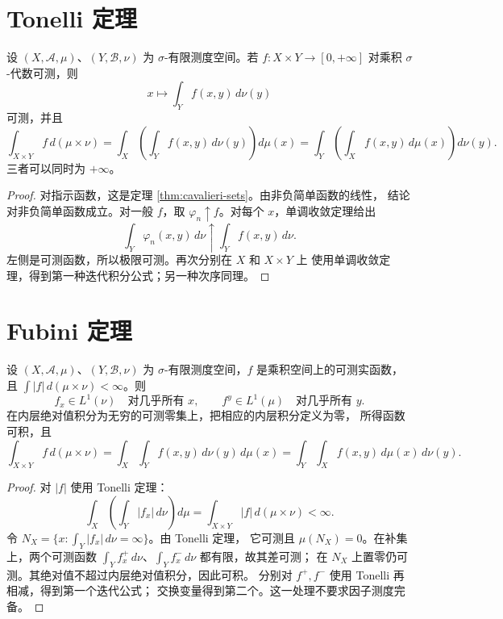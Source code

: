 \section{Tonelli 定理}

\begin{theorem}[Tonelli]
\label{thm:tonelli}
设 \((X,\mathcal A,\mu)\)、\((Y,\mathcal B,\nu)\) 为
\(\sigma\)-有限测度空间。若 \(f:X\times Y\to[0,+\infty]\)
对乘积 \(\sigma\)-代数可测，则
\[
 x\longmapsto\int_Yf(x,y)\,d\nu(y)
\]
可测，并且
\[
 \int_{X\times Y}f\,d(\mu\times\nu)
 =\int_X\left(\int_Yf(x,y)\,d\nu(y)\right)d\mu(x)
 =\int_Y\left(\int_Xf(x,y)\,d\mu(x)\right)d\nu(y).
\]
三者可以同时为 \(+\infty\)。
\end{theorem}

\begin{proof}
对指示函数，这是定理 \ref{thm:cavalieri-sets}。由非负简单函数的线性，
结论对非负简单函数成立。对一般 \(f\)，取
\(\varphi_n\uparrow f\)。对每个 \(x\)，单调收敛定理给出
\[
 \int_Y\varphi_n(x,y)\,d\nu\uparrow\int_Yf(x,y)\,d\nu.
\]
左侧是可测函数，所以极限可测。再次分别在 \(X\) 和 \(X\times Y\) 上
使用单调收敛定理，得到第一种迭代积分公式；另一种次序同理。
\end{proof}

\section{Fubini 定理}

\begin{theorem}[Fubini]
\label{thm:fubini}
设 \((X,\mathcal A,\mu)\)、\((Y,\mathcal B,\nu)\) 为
\(\sigma\)-有限测度空间，\(f\) 是乘积空间上的可测实函数，且
\(\int|f|\,d(\mu\times\nu)<\infty\)。则
\[
 f_x\in L^1(\nu)\quad\text{对几乎所有 }x,
\qquad
 f^y\in L^1(\mu)\quad\text{对几乎所有 }y.
\]
在内层绝对值积分为无穷的可测零集上，把相应的内层积分定义为零，
所得函数可积，且
\[
 \int_{X\times Y}f\,d(\mu\times\nu)
 =\int_X\int_Yf(x,y)\,d\nu(y)\,d\mu(x)
 =\int_Y\int_Xf(x,y)\,d\mu(x)\,d\nu(y).
\]
\end{theorem}

\begin{proof}
对 \(|f|\) 使用 Tonelli 定理：
\[
 \int_X\left(\int_Y|f_x|\,d\nu\right)d\mu
 =\int_{X\times Y}|f|\,d(\mu\times\nu)<\infty.
\]
令 \(N_X=\{x:\int_Y|f_x|\,d\nu=\infty\}\)。由 Tonelli 定理，
它可测且 \(\mu(N_X)=0\)。在补集上，两个可测函数
\(\int_Y f_x^+\,d\nu\)、\(\int_Y f_x^-\,d\nu\) 都有限，故其差可测；
在 \(N_X\) 上置零仍可测。其绝对值不超过内层绝对值积分，因此可积。
分别对 \(f^+,f^-\) 使用 Tonelli 再相减，得到第一个迭代公式；
交换变量得到第二个。这一处理不要求因子测度完备。
\end{proof}

